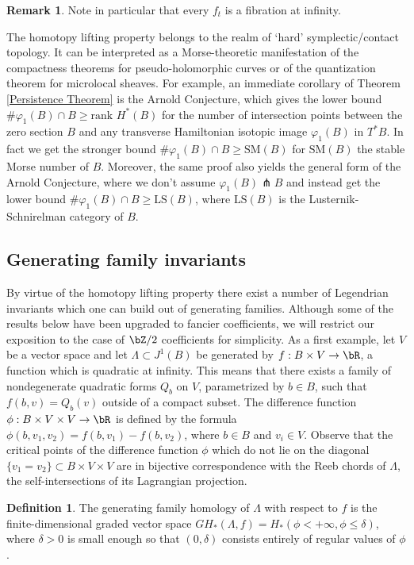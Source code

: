 \documentclass[JEP,XML,SOM,Unicode,NoFloatCountersInSection]{cedram}
\theoremstyle{plain}
\theoremstyle{definition}
\newtheorem{definition}[theorem]{Definition}
\newtheorem{remark}[theorem]{Remark}
\begin{document}
\begin{remark} Note in particular that every $f_t$ is a fibration at infinity. \end{remark}

The homotopy lifting property belongs to the realm of `hard' symplectic/contact topology. It can be interpreted as a Morse-theoretic manifestation of the compactness theorems for pseudo-holomorphic curves or of the quantization theorem for microlocal sheaves. For example, an immediate corollary of Theorem \ref{Persistence Theorem} is the Arnold Conjecture, which gives the lower bound $\# \varphi_1(B) \cap B\geq \text{rank }H^*(B)$ for the number of intersection points between the zero section $B$ and any transverse Hamiltonian isotopic image $\varphi_1(B)$ in $T^*B$. In fact we get the stronger bound $\# \varphi_1(B) \cap B\geq \text{SM}(B)$ for $\text{SM}(B)$ the stable Morse number of $B$. Moreover, the same proof also yields the general form of the Arnold Conjecture, where we don't assume $\varphi_1(B) \pitchfork B$ and instead get the lower bound $\# \varphi_1(B) \cap B \geq \text{LS}(B)$, where $\text{LS}(B)$ is the Lusternik-Schnirelman category of $B$.

\subsection{Generating family invariants}

By virtue of the homotopy lifting property there exist a number of Legendrian invariants which one can build out of generating families. Although some of the results below have been upgraded to fancier coefficients, we will restrict our exposition to the case of $\bZ/2$ coefficients for simplicity. As a first example, let $V$ be a vector space and let $\Lambda \subset J^1(B)$ be generated by $f:B \times V \to \bR$, a function which is quadratic at infinity. This means that there exists a family of nondegenerate quadratic forms $Q_b$ on $V$, parametrized by $b \in B$, such that $f(b,v) = Q_b(v)$ outside of a compact subset. The difference function $\phi: B \times V \times V \to \bR$ is defined by the formula $\phi(b,v_1,v_2)=f(b,v_1)-f(b,v_2)$, where $ b \in B$ and $v_i \in V$. Observe that the critical points of the difference function $\phi$ which do not lie on the diagonal $\{ v_1 = v_2 \} \subset B \times V \times V$ are in bijective correspondence with the Reeb chords of $\Lambda$, \ie the self-intersections of its Lagrangian projection.

\begin{definition}
The generating family homology of $\Lambda$ with respect to $f$ is the finite-dimensional graded vector space $GH_*(\Lambda, f) = H_*(\phi<+\infty, \phi \leq \delta)$, where $\delta>0$ is small enough so that $(0, \delta)$ consists entirely of regular values of $\phi$.
\end{definition}
\end{document}
